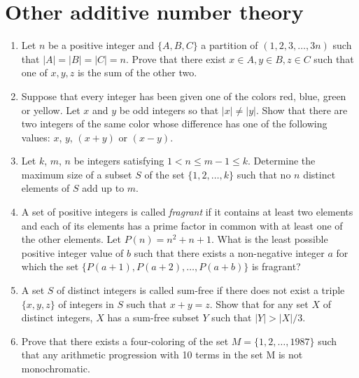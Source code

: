 \documentclass{article}
\begin{document}
\section{Other additive number theory}
\begin{enumerate}
    \item Let $n$ be a positive integer and $\{A, B, C\}$ a partition of $(1, 2,
        3, \ldots, 3n)$ such that $|A| = |B| = |C| = n$. 
        Prove that there exist $x \in A, y \in B, z \in C$ such that one of $x,
        y, z$ is the sum of the other two. 
    \item Suppose that every integer has been given one of the colors 
    red, blue, green or yellow. Let $x$ and $y$ be odd integers so that 
    $|x| \ne |y|$. Show that there are two integers of the same color whose difference
    has one of the following values: $x$, $y$, $(x+y)$ or 
    $(x-y)$.  

    \item Let $k$, $m$, $n$ be integers satisfying $1 < n \le m-1 \le k$. Determine 
    the maximum size of a subset $S$ of the set $\{1, 2, \ldots, k\}$ such that 
    no $n$ distinct elements of $S$ add up to $m$.

    \item A set of positive integers is called \emph{fragrant} if it contains at least two
    elements and each of its elements has a prime factor in common with at least
    one of the other elements. Let $P(n)=n^2+n+1$. What is the least possible
    positive integer value of $b$ such that there exists a non-negative integer
    $a$ for which the set $\{P(a+1),P(a+2),\ldots,P(a+b)\}$ is fragrant?

    \item A set $S$ of distinct integers is called sum-free if there does not 
    exist a triple $\{x, y, z\}$ of integers in $S$ such that $x + y = z$. Show 
    that for any set $X$ of distinct integers, $X$ has a sum-free subset 
    $Y$ such that $|Y| > |X|/3$.

    \item Prove that there exists a four-coloring of the set $M = \{1,2,\ldots,1987\}$
    such that any arithmetic progression with 10 terms in the set M is not
    monochromatic.
\end{enumerate}
\end{document}
